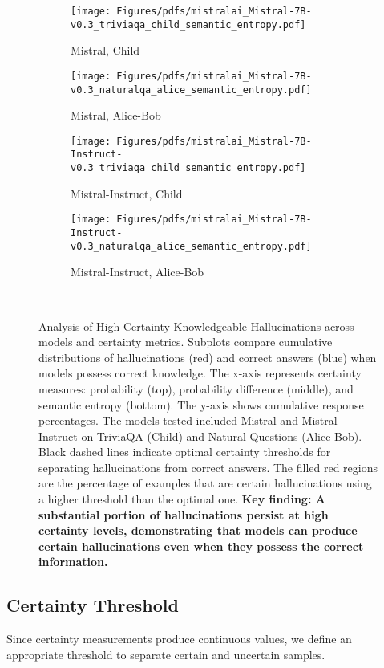 \begin{figure*}[t]
  \centering
 \centering
\begin{subfigure}[b]{0.24\textwidth}
  \centering
  \texttt{[image: Figures/pdfs/mistralai\_Mistral-7B-v0.3\_triviaqa\_child\_semantic\_entropy.pdf]}
 \caption{Mistral, Child}
 \end{subfigure}%
 \hfill
  \centering
\begin{subfigure}[b]{0.24\textwidth}
  \centering
  \texttt{[image: Figures/pdfs/mistralai\_Mistral-7B-v0.3\_naturalqa\_alice\_semantic\_entropy.pdf]}
  \caption{Mistral, Alice-Bob}
 \end{subfigure}
 \hfill
\begin{subfigure}[b]{0.24\textwidth}
  \centering
  \texttt{[image: Figures/pdfs/mistralai\_Mistral-7B-Instruct-v0.3\_triviaqa\_child\_semantic\_entropy.pdf]}
  \caption{Mistral-Instruct, Child}
  \end{subfigure}
  \hfill
  \begin{subfigure}[b]{0.24\textwidth}
  \centering
  \texttt{[image: Figures/pdfs/mistralai\_Mistral-7B-Instruct-v0.3\_naturalqa\_alice\_semantic\_entropy.pdf]}
  \caption{Mistral-Instruct, Alice-Bob}
 \end{subfigure}\\

 \caption{
  Analysis of High-Certainty Knowledgeable Hallucinations across models and certainty metrics. Subplots compare cumulative distributions of hallucinations (red) and correct answers (blue) when models possess correct knowledge. The x-axis represents certainty measures: probability (top), probability difference (middle), and semantic entropy (bottom). The y-axis shows cumulative response percentages. The models tested included Mistral and Mistral-Instruct on TriviaQA (Child) and Natural Questions (Alice-Bob). Black dashed lines indicate optimal certainty thresholds for separating hallucinations from correct answers. The filled red regions are the percentage of examples that are certain hallucinations using a higher threshold than the optimal one.
  \textbf{Key finding: A substantial portion of hallucinations persist at high certainty levels, demonstrating that models can produce certain hallucinations even when they possess the correct information.}}
 \label{fig:Hallucinations from miss knowledge vs. hallucinations regardless of knowledge vs. non-hallucination-knowledge classification}
\end{figure*}
\subsection{Certainty Threshold}\label{subsec:Certainty Threshold}
Since certainty measurements produce continuous values, we define an appropriate threshold to separate certain and uncertain samples. 

